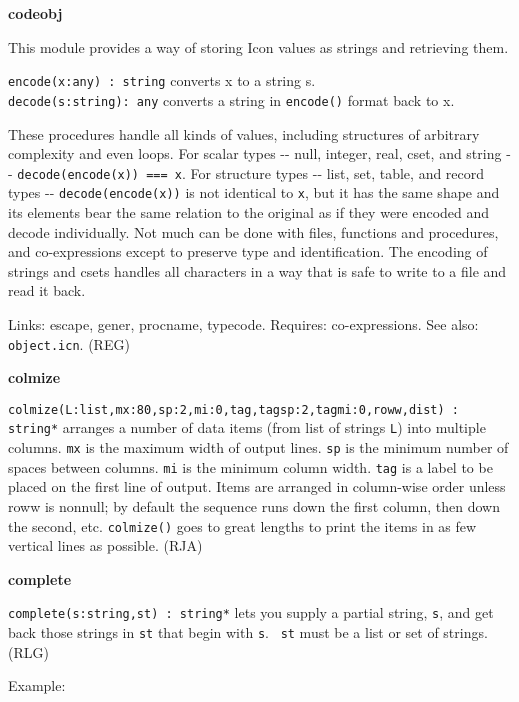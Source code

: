 {\sffamily\bfseries
codeobj}

This module provides a way of storing Icon values as strings and
retrieving them.

\texttt{encode(x:any) : string} converts x to a string s.\\
\texttt{decode(s:string): any} converts a string in \texttt{encode()}
format back to x.

These procedures handle all kinds of values, including structures of
arbitrary complexity and even loops. For scalar types -{}- null,
integer, real, cset, and string -{}- \texttt{decode(encode(x)) === x}.
For structure types -{}- list, set, table, and record types -{}-
\texttt{decode(encode(x))} is not identical to \texttt{x}, but it has
the same {\textquotedbl}shape{\textquotedbl} and its elements bear the
same relation to the original as if they were encoded and decode
individually. Not much can be done with files, functions and
procedures, and co-expressions except to preserve type and
identification. The encoding of strings and csets handles all
characters in a way that is safe to write to a file and read it back.

Links: \textsf{escape}, \textsf{gener}, \textsf{procname},
\textsf{typecode}. Requires: co-expressions. See also:
\texttt{object.icn}. (REG)

{\sffamily\bfseries
colmize}

\texttt{colmize(L:list,mx:80,sp:2,mi:0,tag,tagsp:2,tagmi:0,roww,dist) :
string*} arranges a number of data items (from list of strings
\texttt{L}) into multiple columns. \texttt{mx} is the maximum width of
output lines. \texttt{sp} is the minimum number of spaces between
columns. \texttt{mi} is the minimum column width. \texttt{tag} is a
label to be placed on the first line of output. Items are arranged in
column-wise order unless roww is nonnull; by default the sequence runs
down the first column, then down the second, etc. \texttt{colmize()}
goes to great lengths to print the items in as few vertical lines as
possible. (RJA)

{\sffamily\bfseries
complete}

\texttt{complete(s:string,st) : string*} lets you
supply a partial string, \texttt{s}, and get back those strings in
\texttt{st} that begin with \texttt{s}. \ \texttt{st} must be a list or
set of strings. (RLG)

Example:

